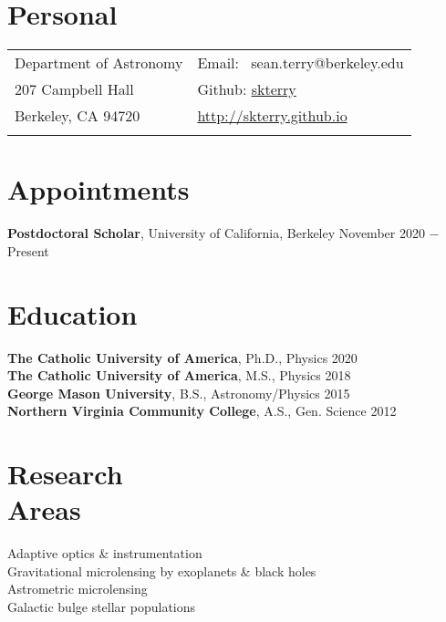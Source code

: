 \documentclass[margin,line]{cv}
\begin{document}

\begin{resume}
\section{\sc Personal}

\vspace{.05in}
\begin{tabular}{@{}p{3.5in}p{3in}}
Department of Astronomy      & Email: \,\,\,sean.terry@berkeley.edu \\
207 Campbell Hall       &  Github: \hyperlink{https://github.com/skterry}{skterry} \\
Berkeley, CA 94720       & \hyperlink{http://skterry.github.io}{http://skterry.github.io}\\
 \\
\end{tabular}

\section{\sc Appointments}
{\bf Postdoctoral Scholar}, University of California, Berkeley  \hfill      {November 2020 $-$ Present}\\


\section{\sc Education}
{\bf The Catholic University of America}, Ph.D., Physics  \hfill 2020\\
{\bf The Catholic University of America}, M.S., Physics  \hfill 2018\\
{\bf George Mason University}, B.S., Astronomy/Physics \hfill 2015\\
{\bf Northern Virginia Community College}, A.S., Gen. Science \hfill 2012\\

\section{\sc Research\\ Areas}
Adaptive optics \& instrumentation \\
Gravitational microlensing by exoplanets \& black holes  \\
Astrometric microlensing \\
Galactic bulge stellar populations  \\



\end{resume}
\end{document}
